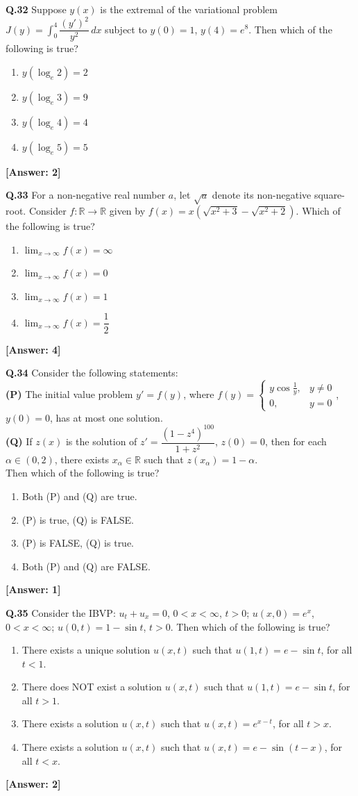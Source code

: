 \documentclass[12pt,a4paper]{article}
\newcommand{\ans}[1]{\quad\textcolor{anscolor}{\textbf{[Answer: #1]}}}
\begin{document}
\textbf{Q.32} Suppose $y(x)$ is the extremal of the variational problem $J(y)=\int_0^4\dfrac{(y')^2}{y^2}\,dx$ subject to $y(0)=1$, $y(4)=e^8$. Then which of the following is true?
\begin{enumerate}[label=\arabic*.]
\item $y(\log_e2)=2$ \item $y(\log_e3)=9$ \item $y(\log_e4)=4$ \item $y(\log_e5)=5$
\end{enumerate}\ans{2}

\textbf{Q.33} For a non-negative real number $a$, let $\sqrt{a}$ denote its non-negative square-root. Consider $f:\mathbb{R}\to\mathbb{R}$ given by $f(x)=x\!\left(\sqrt{x^2+3}-\sqrt{x^2+2}\right)$. Which of the following is true?
\begin{enumerate}[label=\arabic*.]
\item $\lim_{x\to\infty}f(x)=\infty$ \item $\lim_{x\to\infty}f(x)=0$
\item $\lim_{x\to\infty}f(x)=1$ \item $\lim_{x\to\infty}f(x)=\dfrac{1}{2}$
\end{enumerate}\ans{4}

\textbf{Q.34} Consider the following statements:\\
\textbf{(P)} The initial value problem $y'=f(y)$, where $f(y)=\begin{cases}y\cos\frac{1}{y}, & y\neq0\\0, & y=0\end{cases}$, $y(0)=0$, has at most one solution.\\
\textbf{(Q)} If $z(x)$ is the solution of $z'=\dfrac{(1-z^4)^{100}}{1+z^2}$, $z(0)=0$, then for each $\alpha\in(0,2)$, there exists $x_\alpha\in\mathbb{R}$ such that $z(x_\alpha)=1-\alpha$.\\
Then which of the following is true?
\begin{enumerate}[label=\arabic*.]
\item Both (P) and (Q) are true. \item (P) is true, (Q) is FALSE.
\item (P) is FALSE, (Q) is true. \item Both (P) and (Q) are FALSE.
\end{enumerate}\ans{1}

\textbf{Q.35} Consider the IBVP: $u_t+u_x=0$, $0<x<\infty$, $t>0$; $u(x,0)=e^x$, $0<x<\infty$; $u(0,t)=1-\sin t$, $t>0$. Then which of the following is true?
\begin{enumerate}[label=\arabic*.]
\item There exists a unique solution $u(x,t)$ such that $u(1,t)=e-\sin t$, for all $t<1$.
\item There does NOT exist a solution $u(x,t)$ such that $u(1,t)=e-\sin t$, for all $t>1$.
\item There exists a solution $u(x,t)$ such that $u(x,t)=e^{x-t}$, for all $t>x$.
\item There exists a solution $u(x,t)$ such that $u(x,t)=e-\sin(t-x)$, for all $t<x$.
\end{enumerate}\ans{2}
\end{document}
